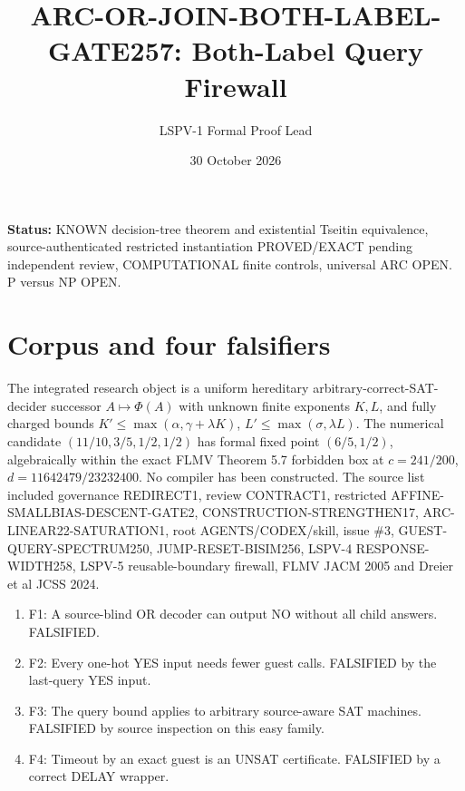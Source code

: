 \documentclass[11pt]{article}
\title{ARC-OR-JOIN-BOTH-LABEL-GATE257: Both-Label Query Firewall}
\author{LSPV-1 Formal Proof Lead}
\date{30 October 2026}
\begin{document}
\maketitle
\noindent\textbf{Status:} KNOWN decision-tree theorem and existential Tseitin equivalence, source-authenticated restricted instantiation PROVED/EXACT pending independent review, COMPUTATIONAL finite controls, universal ARC OPEN. P versus NP OPEN.

\section{Corpus and four falsifiers}
The integrated research object is a uniform hereditary arbitrary-correct-SAT-decider successor $A\mapsto\Phi(A)$ with unknown finite exponents $K,L$, and fully charged bounds $K'\le\max(\alpha,\gamma+\lambda K)$, $L'\le\max(\sigma,\lambda L)$. The numerical candidate $(11/10,3/5,1/2,1/2)$ has formal fixed point $(6/5,1/2)$, algebraically within the exact FLMV Theorem 5.7 forbidden box at $c=241/200$, $d=11642479/23232400$. No compiler has been constructed. The source list included governance REDIRECT1, review CONTRACT1, restricted AFFINE-SMALLBIAS-DESCENT-GATE2, CONSTRUCTION-STRENGTHEN17, ARC-LINEAR22-SATURATION1, root AGENTS/CODEX/skill, issue \#3, GUEST-QUERY-SPECTRUM250, JUMP-RESET-BISIM256, LSPV-4 RESPONSE-WIDTH258, LSPV-5 reusable-boundary firewall, FLMV JACM 2005 and Dreier et al JCSS 2024.

\begin{enumerate}
\item[] F1: A source-blind OR decoder can output NO without all child answers. FALSIFIED.
\item[] F2: Every one-hot YES input needs fewer guest calls. FALSIFIED by the last-query YES input.
\item[] F3: The query bound applies to arbitrary source-aware SAT machines. FALSIFIED by source inspection on this easy family.
\item[] F4: Timeout by an exact guest is an UNSAT certificate. FALSIFIED by a correct DELAY wrapper.
\end{enumerate}
\end{document}
